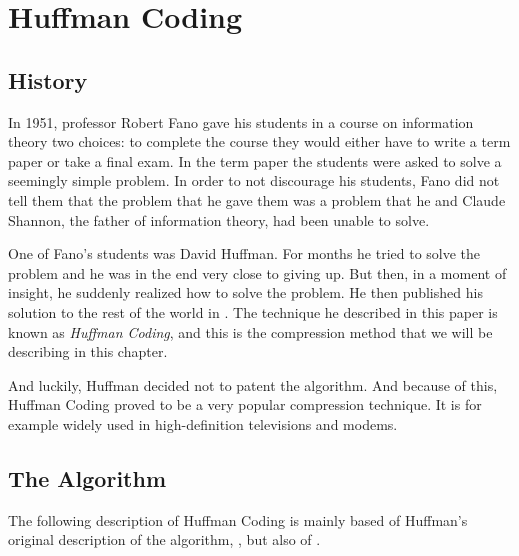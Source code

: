 \begin{comment}
  
\end{comment}


\chapter{Huffman Coding}
\label{cha:huffman}

\section{History}

In 1951, professor Robert Fano gave his students in a course on
information theory two choices: to complete the course they would
either have to write a term paper or take a final exam. In the term
paper the students were asked to solve a seemingly simple problem. In
order to not discourage his students, Fano did not tell them that the
problem that he gave them was a problem that he and Claude Shannon,
the father of information theory, had been unable to
solve\cite{stix91:_profil}.

One of Fano's students was David Huffman. For months he tried to solve
the problem and he was in the end very close to giving up. But then,
in a moment of insight, he suddenly realized how to solve the
problem. He then published his solution to the rest of the world in
\cite{huf52}. The technique he described in this paper is known as
\textit{Huffman Coding}, and this is the compression method that we
will be describing in this chapter.

And luckily, Huffman decided not to patent the algorithm. And because
of this, Huffman Coding proved to be a very popular compression
technique. It is for example widely used in high-definition
televisions and modems.

\section{The Algorithm}

The following description of Huffman Coding is mainly based of
Huffman's original description of the algorithm, \cite{huf52}, but
also of
\cite{Salomon:2004:DCC,mark1996data_compression_book,mcfadden92:_hackin_data_compr,mahoney11:_data_compr_explain,Lelewer:1987:DC:45072.45074,cormen2009introduction_to_algo}.

